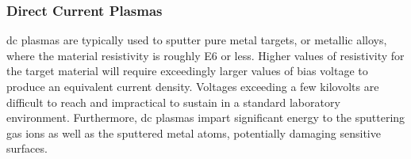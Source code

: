 \documentclass[../../../main.tex]{subfiles}
\begin{document}
%
    \subsubsection{Direct Current Plasmas}%
    \label{app:thin-film-processing:plasma-sputtering:dc-plasmas}%
    \Gls{dc} plasmas are typically used to sputter pure metal targets, or metallic alloys, where the material resistivity is roughly \SI{E6}{\ohmcm} or less.
    Higher values of resistivity for the target material will require exceedingly larger values of bias voltage to produce an equivalent current density.
    Voltages exceeding a few kilovolts are difficult to reach and impractical to sustain in a standard laboratory environment.
    Furthermore, \gls{dc} plasmas impart significant energy to the sputtering gas ions as well as the sputtered metal atoms, potentially damaging sensitive surfaces.
\end{document}
